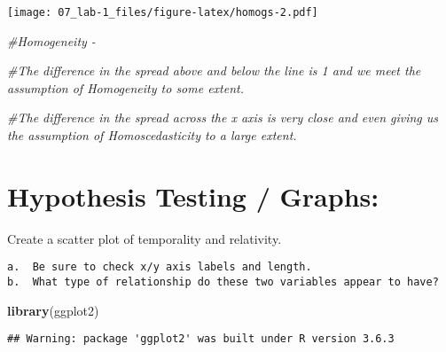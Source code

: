 \documentclass[
]{article}
\newenvironment{Shaded}{\begin{snugshade}}{\end{snugshade}}
\newcommand{\CommentTok}[1]{\textcolor[rgb]{0.56,0.35,0.01}{\textit{#1}}}
\newcommand{\DataTypeTok}[1]{\textcolor[rgb]{0.13,0.29,0.53}{#1}}
\newcommand{\KeywordTok}[1]{\textcolor[rgb]{0.13,0.29,0.53}{\textbf{#1}}}
\newcommand{\NormalTok}[1]{#1}
\newcommand{\OperatorTok}[1]{\textcolor[rgb]{0.81,0.36,0.00}{\textbf{#1}}}
\newcommand{\OtherTok}[1]{\textcolor[rgb]{0.56,0.35,0.01}{#1}}
\newcommand{\StringTok}[1]{\textcolor[rgb]{0.31,0.60,0.02}{#1}}
\begin{document}
\texttt{[image: 07\_lab-1\_files/figure-latex/homogs-2.pdf]}

\begin{Shaded}
\begin{Highlighting}[]
\CommentTok{#Homogeneity - }

\CommentTok{#The difference in the spread above and below the line is 1 and we meet the assumption of Homogeneity to some extent.}

\CommentTok{#The difference in the spread across the x axis is very close and even giving us the assumption of Homoscedasticity to a large extent.}
\end{Highlighting}
\end{Shaded}

\hypertarget{hypothesis-testing-graphs}{%
\section{Hypothesis Testing / Graphs:}\label{hypothesis-testing-graphs}}

Create a scatter plot of temporality and relativity.

\begin{verbatim}
a.  Be sure to check x/y axis labels and length.
b.  What type of relationship do these two variables appear to have?
\end{verbatim}

\begin{Shaded}
\begin{Highlighting}[]
\KeywordTok{library}\NormalTok{(ggplot2)}
\end{Highlighting}
\end{Shaded}

\begin{verbatim}
## Warning: package 'ggplot2' was built under R version 3.6.3
\end{verbatim}

\begin{Shaded}
\end{Shaded}
\end{document}
